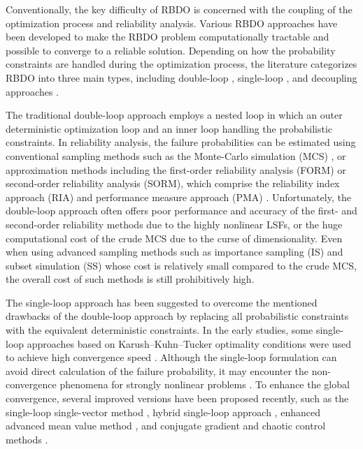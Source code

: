 \documentclass[preprint,3p]{elsarticle}
\begin{document}
\begin{linenumbers}
Conventionally, the key difficulty of RBDO is concerned with the coupling of the optimization process and reliability analysis. Various RBDO approaches have been developed to make the RBDO problem computationally tractable and possible to converge to a reliable solution. Depending on how the probability constraints are handled during the optimization process, the literature categorizes RBDO into three main types, including double-loop \cite{Zhang2021, youn2003, NIKOLAIDIS1988, KESHTEGAR2018a, keshtegar2018b, RASHKI2012, Yang2020, Hao2019}, single-loop \cite{Mansour2016, Jiang2017, Meng2019, Wauters2021, Yang2021, YANG2022, MENG2019a, liang2007, MENG2015, jeong2017}, and decoupling approaches \cite{Du2004, Goswami2019, Li2016, FAES2020, Li2020, ZHANG2021a, zhang2021b, jiang2020, hamza2022, chen2018, SafaeianHamzehkolaei2016, zheng2023}. 

The traditional double-loop approach employs a nested loop in which an outer deterministic optimization loop and an inner loop handling the probabilistic constraints. In reliability analysis, the failure probabilities can be estimated using conventional sampling methods such as the Monte-Carlo simulation (MCS) \cite{RASHKI2012}, or approximation methods including the first-order reliability analysis (FORM) or second-order reliability analysis (SORM), which comprise the reliability index approach (RIA) \cite{Zhang2021, youn2003, NIKOLAIDIS1988, Yang2020} and performance measure approach (PMA) \cite{KESHTEGAR2018a, keshtegar2018b, Hao2019}. Unfortunately, the double-loop approach often offers poor performance and accuracy of the first- and second-order reliability methods due to the highly nonlinear LSFs, or the huge computational cost of the crude MCS due to the curse of dimensionality. Even when using advanced sampling methods such as importance sampling (IS) \cite{CHAUDHURI2020} and subset simulation (SS) \cite{li2016a} whose cost is relatively small compared to the crude MCS, the overall cost of such methods is still prohibitively high. 

The single-loop approach has been suggested to overcome the mentioned drawbacks of the double-loop approach by replacing all probabilistic constraints with the equivalent deterministic constraints. In the early studies, some single-loop approaches based on Karush–Kuhn–Tucker optimality conditions were used to achieve high convergence speed \cite{liang2007}. Although the single-loop formulation can avoid direct calculation of the failure probability, it may encounter the non-convergence phenomena for strongly nonlinear problems \cite{MENG2019a}. To enhance the global convergence, several improved versions have been proposed recently, such as the single-loop single-vector method \cite{jeong2017}, hybrid single-loop approach \cite{Jiang2017, Yang2021}, enhanced advanced mean value method  \cite{yang2020a}, and conjugate gradient and chaotic control methods \cite{yang2020a, MENG2019a, MENG2015}. 


\end{linenumbers}
\end{document}
